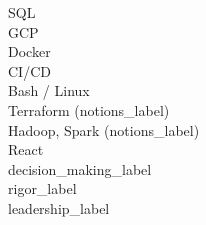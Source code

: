 \documentclass[9pt]{developercv} %
\begin{document}
\begin{minipage}[t]{1\textwidth}
\begin{minipage}[t]{0.725\textwidth}
\begin{minipage}[t]{0.45\textwidth}
            \end{minipage}
            \hfill
            \begin{minipage}[t]{0.45\textwidth} %
                \vspace{0pt} %
                SQL \\
                GCP \\
                Docker \\
                CI/CD \\
                Bash / Linux \\
                Terraform ({{notions_label}}) \\
                Hadoop, Spark ({{notions_label}}) \\
                React \\
                {{decision_making_label}} \\
                {{rigor_label}} \\
                {{leadership_label}}
            \end{minipage}
        \end{minipage}
    \end{minipage}

\end{document}
